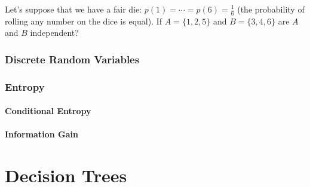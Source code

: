 \documentclass{mlnotes}
\begin{document}
Let's suppose that we have a fair die: \(p(1) = \cdots = p(6) = \frac{1}{6}\) (the
probability of rolling any number on the dice is equal). If \(A = \{1,2,5\}\)
and \(B = \{3,4,6\}\) are \(A\) and \(B\) independent?

\section{Discrete Random Variables}
\section{Entropy}
\subsection{Conditional Entropy}
\subsection{Information Gain}

\part{Decision Trees}

\printindex[defn]
\end{document}
